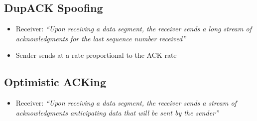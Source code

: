 \subsection{DupACK Spoofing}
\begin{itemize}[nosep]
    \item Receiver: \textit{``Upon receiving a data segment, the receiver sends a long stream of acknowledgments for the last sequence number received''}
    \item Sender sends at a rate proportional to the ACK rate
\end{itemize}
\subsection{Optimistic ACKing}
\begin{itemize}[nosep]
    \item Receiver: \textit{``Upon receiving a data segment, the receiver sends a stream of acknowledgments anticipating data that will be sent by the sender''}
\end{itemize}
